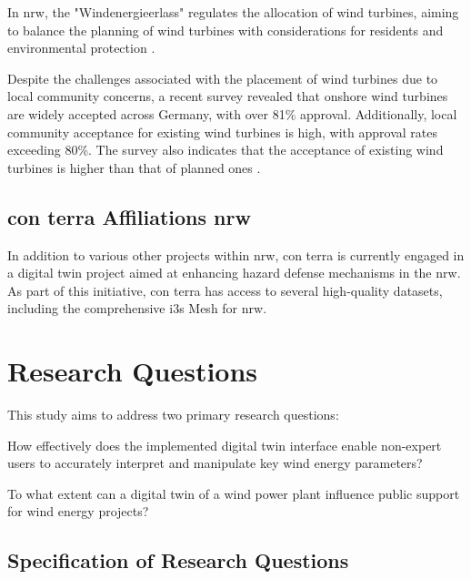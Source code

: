 \documentclass[11pt, titlepage, a4paper]{scrartcl}
\begin{document}
\begin{linenumbers}
In \gls{nrw}, the "Windenergieerlass" \cite{nrwErlassFurPlanung} regulates the allocation of wind turbines, aiming to balance the planning of wind turbines with considerations for residents and environmental protection \cite{nrwErlassFurPlanung}.

Despite the challenges associated with the placement of wind turbines due to local community concerns, a recent survey revealed that onshore wind turbines are widely accepted across Germany, with over 81\% approval. Additionally, local community acceptance for existing wind turbines is high, with approval rates exceeding 80\%. The survey also indicates that the acceptance of existing wind turbines is higher than that of planned ones \cite{fachagenturwindenergieanlandUmfrageZurAkzeptanz}.

\subsection{con terra Affiliations \gls{nrw}}
In addition to various other projects within \gls{nrw}, con terra is currently engaged in a digital twin project aimed at enhancing hazard defense mechanisms in the \gls{nrw}. As part of this initiative, con terra has access to several high-quality datasets, including the comprehensive \gls{i3s} Mesh for \gls{nrw}.


\section{Research Questions}

This study aims to address two primary research questions:

\begin{questions}
    \item \label{rq:first_q} How effectively does the implemented digital twin interface enable non-expert users to accurately interpret and manipulate key wind energy parameters?
    \item \label{rq:second_q} To what extent can a digital twin of a wind power plant influence public support for wind energy projects?
\end{questions}

\subsection{Specification of Research Questions}


\end{linenumbers}
\end{document}
